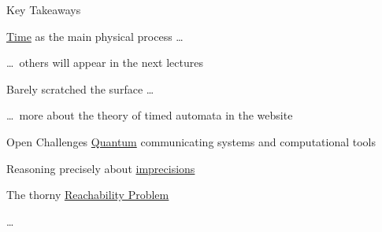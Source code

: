 \documentclass{beamer}
\begin{document}
\begin{frame}{Key Takeaways}


        \vspace{0.4cm}
        \alert{\underline{Time}} as the main physical process \dots

        \dots\ others will appear in the next lectures

        \vspace{0.4cm}
        Barely scratched the surface \dots

        \dots\ more about the theory of timed automata 
        in the website
\end{frame}
\begin{frame}{Open Challenges}
        \alert{\underline{Quantum}} communicating systems and computational
        tools

        Reasoning precisely about \alert{\underline{imprecisions}}

        The thorny
        \href{https://www.youtube.com/watch?v=IzSs_gJDVzI}{\alert{\underline{Reachability
        Problem}}}

        \dots
\end{frame}
\end{document}

